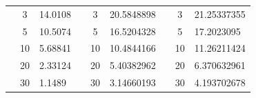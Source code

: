 \begin{table}[]
\begin{tabular}{|cclcclccl|}
\rowcolor[HTML]{DAE8FC} 
\multicolumn{1}{|c|}{\cellcolor[HTML]{FFFFC7}}                                & \multicolumn{1}{c|}{\cellcolor[HTML]{DAE8FC}3}         & \multicolumn{1}{l|}{\cellcolor[HTML]{DAE8FC}14.0108}    & \multicolumn{1}{c|}{\cellcolor[HTML]{FFFFC7}}                                & \multicolumn{1}{c|}{\cellcolor[HTML]{DAE8FC}3}         & \multicolumn{1}{l|}{\cellcolor[HTML]{DAE8FC}20.5848898} & \multicolumn{1}{c|}{\cellcolor[HTML]{FFFFC7}}                                & \multicolumn{1}{c|}{\cellcolor[HTML]{DAE8FC}3}         & 21.25337355 \\ \cline{2-3} \cline{5-6} \cline{8-9} 
\rowcolor[HTML]{DDFDFF} 
\multicolumn{1}{|c|}{\cellcolor[HTML]{FFFFC7}}                                & \multicolumn{1}{c|}{\cellcolor[HTML]{DDFDFF}5}         & \multicolumn{1}{l|}{\cellcolor[HTML]{DDFDFF}10.5074}    & \multicolumn{1}{c|}{\cellcolor[HTML]{FFFFC7}}                                & \multicolumn{1}{c|}{\cellcolor[HTML]{DDFDFF}5}         & \multicolumn{1}{l|}{\cellcolor[HTML]{DDFDFF}16.5204328} & \multicolumn{1}{c|}{\cellcolor[HTML]{FFFFC7}}                                & \multicolumn{1}{c|}{\cellcolor[HTML]{DDFDFF}5}         & 17.2023095  \\ \cline{2-3} \cline{5-6} \cline{8-9} 
\rowcolor[HTML]{DAE8FC} 
\multicolumn{1}{|c|}{\cellcolor[HTML]{FFFFC7}}                                & \multicolumn{1}{c|}{\cellcolor[HTML]{DAE8FC}10}        & \multicolumn{1}{l|}{\cellcolor[HTML]{DAE8FC}5.68841}    & \multicolumn{1}{c|}{\cellcolor[HTML]{FFFFC7}}                                & \multicolumn{1}{c|}{\cellcolor[HTML]{DAE8FC}10}        & \multicolumn{1}{l|}{\cellcolor[HTML]{DAE8FC}10.4844166} & \multicolumn{1}{c|}{\cellcolor[HTML]{FFFFC7}}                                & \multicolumn{1}{c|}{\cellcolor[HTML]{DAE8FC}10}        & 11.26211424 \\ \cline{2-3} \cline{5-6} \cline{8-9} 
\rowcolor[HTML]{DDFDFF} 
\multicolumn{1}{|c|}{\cellcolor[HTML]{FFFFC7}}                                & \multicolumn{1}{c|}{\cellcolor[HTML]{DDFDFF}20}        & \multicolumn{1}{l|}{\cellcolor[HTML]{DDFDFF}2.33124}    & \multicolumn{1}{c|}{\cellcolor[HTML]{FFFFC7}}                                & \multicolumn{1}{c|}{\cellcolor[HTML]{DDFDFF}20}        & \multicolumn{1}{l|}{\cellcolor[HTML]{DDFDFF}5.40382962} & \multicolumn{1}{c|}{\cellcolor[HTML]{FFFFC7}}                                & \multicolumn{1}{c|}{\cellcolor[HTML]{DDFDFF}20}        & 6.370632961 \\ \cline{2-3} \cline{5-6} \cline{8-9} 
\rowcolor[HTML]{DAE8FC} 
\multicolumn{1}{|c|}{\cellcolor[HTML]{FFFFC7}}                                & \multicolumn{1}{c|}{\cellcolor[HTML]{DAE8FC}30}        & \multicolumn{1}{l|}{\cellcolor[HTML]{DAE8FC}1.1489}     & \multicolumn{1}{c|}{\cellcolor[HTML]{FFFFC7}}                                & \multicolumn{1}{c|}{\cellcolor[HTML]{DAE8FC}30}        & \multicolumn{1}{l|}{\cellcolor[HTML]{DAE8FC}3.14660193} & \multicolumn{1}{c|}{\cellcolor[HTML]{FFFFC7}}                                & \multicolumn{1}{c|}{\cellcolor[HTML]{DAE8FC}30}        & 4.193702678 \\ \cline{2-3} \cline{5-6} \cline{8-9} 

\end{tabular}
\end{table}
